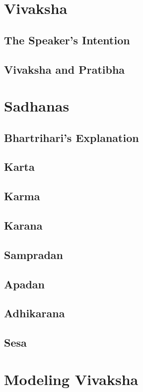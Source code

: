 \documentclass[a4paper,10pt]{article}
\begin{document}
\section{Vivaksha}
\subsection{The Speaker's Intention}
\subsection{Vivaksha and Pratibha}
\section{Sadhanas}
\subsection{Bhartrihari's Explanation}
\subsection{Karta}
\subsection{Karma}
\subsection{Karana}
\subsection{Sampradan}
\subsection{Apadan}
\subsection{Adhikarana}
\subsection{Sesa}
\section{Modeling Vivaksha}
\end{document}

